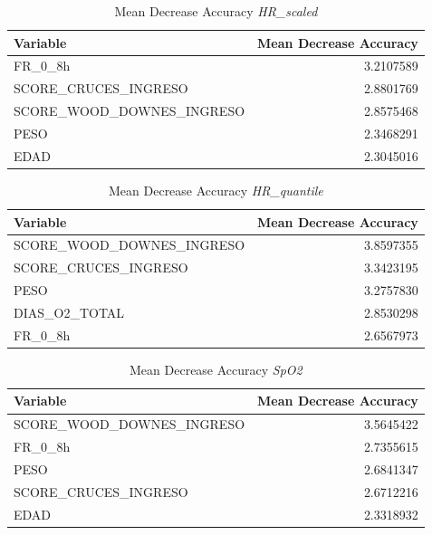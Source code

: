 \begin{table}[H]
    \centering
    \begin{tabular}{lr}
        \toprule
        \textbf{Variable} & \textbf{Mean Decrease Accuracy} \\
        \midrule
        FR\_0\_8h & 3.2107589 \\
        SCORE\_CRUCES\_INGRESO & 2.8801769 \\
        SCORE\_WOOD\_DOWNES\_INGRESO & 2.8575468 \\
        PESO & 2.3468291 \\
        EDAD & 2.3045016 \\
        \bottomrule
    \end{tabular}
    \caption{Mean Decrease Accuracy \textit{HR\_scaled}}
\end{table}

\begin{table}[H]
    \centering
    \begin{tabular}{lr}
        \toprule
        \textbf{Variable} & \textbf{Mean Decrease Accuracy} \\
        \midrule
        SCORE\_WOOD\_DOWNES\_INGRESO & 3.8597355 \\
        SCORE\_CRUCES\_INGRESO & 3.3423195 \\
        PESO & 3.2757830 \\
        DIAS\_O2\_TOTAL & 2.8530298 \\
        FR\_0\_8h & 2.6567973 \\
        \bottomrule
    \end{tabular}
    \caption{Mean Decrease Accuracy \textit{HR\_quantile}} 
\end{table}

\begin{table}[H]
    \centering
    \begin{tabular}{lr}
        \toprule
        \textbf{Variable} & \textbf{Mean Decrease Accuracy} \\
        \midrule
        SCORE\_WOOD\_DOWNES\_INGRESO & 3.5645422 \\
        FR\_0\_8h & 2.7355615 \\
        PESO & 2.6841347 \\
        SCORE\_CRUCES\_INGRESO & 2.6712216 \\
        EDAD & 2.3318932 \\
        \bottomrule
    \end{tabular}
    \caption{Mean Decrease Accuracy \textit{SpO2}}
\end{table}

